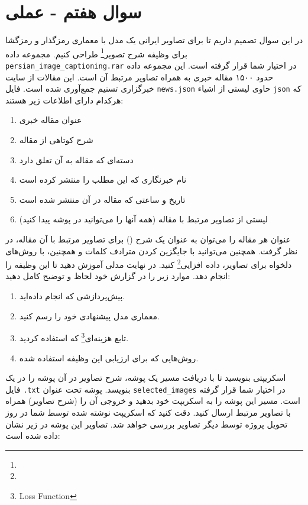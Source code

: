 \section{سوال هفتم - عملی}
در این سوال تصمیم داریم تا برای تصاویر ایرانی یک مدل با معماری رمزگذار و رمزگشا برای وظیفه شرح تصویر\footnote{} طراحی کنیم. مجموعه داده \texttt{persian\_image\_captioning.rar} در اختیار شما قرار گرفته است. این مجموعه داده حدود ۱۵۰۰ مقاله خبری به همراه تصاویر مرتبط آن است. این مقالات از سایت خبرگزاری تسنیم جمع‌آوری شده است. فایل \texttt{news.json} حاوی لیستی از اشیاء \texttt{json} که هرکدام دارای اطلاعات زیر هستند:

\begin{enumerate}
	\item {}عنوان مقاله خبری
	\item {}شرح کوتاهی از مقاله
	\item {}دسته‌ای که مقاله به آن تعلق دارد
	\item {}نام خبرنگاری که این مطلب را منتشر کرده است
	\item {}تاریخ و ساعتی که مقاله در آن منتشر شده است
	\item {}لیستی از تصاویر مرتبط با مقاله (همه آنها را می‌توانید در پوشه  پیدا کنید)
\end{enumerate}


عنوان هر مقاله را می‌توان به عنوان یک شرح () برای تصاویر مرتبط با آن مقاله، در نظر گرفت. همچنین می‌توانید با جایگزین کردن مترادف کلمات و همچنین، با روش‌های دلخواه برای تصاویر، داده افزایی\footnote{} کنید. در نهایت مدلی آموزش دهید تا این وظیفه را انجام دهد. موارد زیر را در گزارش خود لحاظ و توضیح کامل دهید:

\begin{enumerate}
	\item پیش‌پردازشی که انجام داده‌اید.
	\item معماری مدل پیشنهادی خود را رسم کنید.
	\item تابع هزینه‌ای\footnote{Loss Function} که استفاده کردید.
	\item روش‌هایی که برای ارزیابی این وظیفه استفاده شده.
\end{enumerate}


	اسکریپتی بنویسید تا با دریافت مسیر یک پوشه، شرح تصاویر در آن پوشه را در یک فایل \texttt{.txt} بنویسد. پوشه تحت عنوان \texttt{selected\_images} در اختیار شما قرار گرفته است. مسیر این پوشه را به اسکریپت خود بدهید و خروجی آن را (شرح تصاویر) همراه با تصاویر مرتبط ارسال کنید. دقت کنید که اسکریپت نوشته شده توسط شما در روز تحویل پروژه توسط دیگر تصاویر بررسی خواهد شد. تصاویر این پوشه در زیر نشان داده شده است:
	
